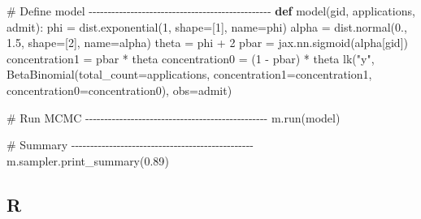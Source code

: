 \documentclass[
  letterpaper,
  DIV=11,
  numbers=noendperiod]{scrreprt}
\newenvironment{Shaded}{\begin{snugshade}}{\end{snugshade}}
\newcommand{\CommentTok}[1]{\textcolor[rgb]{0.37,0.37,0.37}{#1}}
\newcommand{\DecValTok}[1]{\textcolor[rgb]{0.68,0.00,0.00}{#1}}
\newcommand{\FloatTok}[1]{\textcolor[rgb]{0.68,0.00,0.00}{#1}}
\newcommand{\KeywordTok}[1]{\textcolor[rgb]{0.00,0.23,0.31}{\textbf{#1}}}
\newcommand{\NormalTok}[1]{\textcolor[rgb]{0.00,0.23,0.31}{#1}}
\newcommand{\OperatorTok}[1]{\textcolor[rgb]{0.37,0.37,0.37}{#1}}
\newcommand{\StringTok}[1]{\textcolor[rgb]{0.13,0.47,0.30}{#1}}
\begin{document}
\begin{Shaded}
\begin{Highlighting}[]
\CommentTok{\# Define model {-}{-}{-}{-}{-}{-}{-}{-}{-}{-}{-}{-}{-}{-}{-}{-}{-}{-}{-}{-}{-}{-}{-}{-}{-}{-}{-}{-}{-}{-}{-}{-}{-}{-}{-}{-}{-}{-}{-}{-}{-}{-}{-}{-}{-}{-}{-}{-}}
\KeywordTok{def}\NormalTok{ model(gid, applications, admit):}
\NormalTok{    phi }\OperatorTok{=}\NormalTok{ dist.exponential(}\DecValTok{1}\NormalTok{, shape}\OperatorTok{=}\NormalTok{[}\DecValTok{1}\NormalTok{], name}\OperatorTok{=}\StringTok{\textquotesingle{}phi\textquotesingle{}}\NormalTok{)}
\NormalTok{    alpha }\OperatorTok{=}\NormalTok{ dist.normal(}\FloatTok{0.}\NormalTok{, }\FloatTok{1.5}\NormalTok{, shape}\OperatorTok{=}\NormalTok{[}\DecValTok{2}\NormalTok{], name}\OperatorTok{=}\StringTok{\textquotesingle{}alpha\textquotesingle{}}\NormalTok{)}
\NormalTok{    theta }\OperatorTok{=}\NormalTok{ phi }\OperatorTok{+} \DecValTok{2}
\NormalTok{    pbar }\OperatorTok{=}\NormalTok{ jax.nn.sigmoid(alpha[gid])}
\NormalTok{    concentration1 }\OperatorTok{=}\NormalTok{ pbar }\OperatorTok{*}\NormalTok{ theta}
\NormalTok{    concentration0 }\OperatorTok{=}\NormalTok{ (}\DecValTok{1} \OperatorTok{{-}}\NormalTok{ pbar) }\OperatorTok{*}\NormalTok{ theta}
\NormalTok{    lk(}\StringTok{"y"}\NormalTok{, BetaBinomial(total\_count}\OperatorTok{=}\NormalTok{applications, concentration1}\OperatorTok{=}\NormalTok{concentration1, concentration0}\OperatorTok{=}\NormalTok{concentration0), obs}\OperatorTok{=}\NormalTok{admit)}

\CommentTok{\# Run MCMC {-}{-}{-}{-}{-}{-}{-}{-}{-}{-}{-}{-}{-}{-}{-}{-}{-}{-}{-}{-}{-}{-}{-}{-}{-}{-}{-}{-}{-}{-}{-}{-}{-}{-}{-}{-}{-}{-}{-}{-}{-}{-}{-}{-}{-}{-}{-}{-}}
\NormalTok{m.run(model) }

\CommentTok{\# Summary {-}{-}{-}{-}{-}{-}{-}{-}{-}{-}{-}{-}{-}{-}{-}{-}{-}{-}{-}{-}{-}{-}{-}{-}{-}{-}{-}{-}{-}{-}{-}{-}{-}{-}{-}{-}{-}{-}{-}{-}{-}{-}{-}{-}{-}{-}{-}{-}}
\NormalTok{m.sampler.print\_summary(}\FloatTok{0.89}\NormalTok{)}
\end{Highlighting}
\end{Shaded}

\subsection{R}
\end{document}
